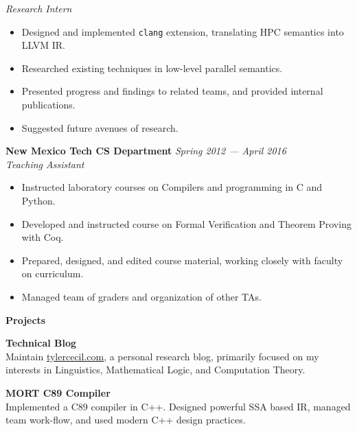 \documentclass[11pt,a4paper,sans]{article}
\newcommand{\cvcolor}[1]{{\color{MidnightBlue}#1}}
\renewcommand{\section}[1]{
  \cvcolor{\noindent \textbf{\LARGE #1}}
  \vspace{.5em}\\
}
\begin{document}
\textsl{Research Intern}
\begin{itemize}
  \item Designed and implemented \texttt{clang} extension, translating HPC semantics into LLVM IR.
  \item Researched existing techniques in low-level parallel semantics.
  \item Presented progress and findings to related teams, and provided internal publications.
  \item Suggested future avenues of research.
\end{itemize}
\vspace{0.2em}
\textbf{New Mexico Tech CS Department} \hfill \textsl{Spring 2012 --- April 2016}\\
\textsl{Teaching Assistant}
\begin{itemize}
  \item Instructed laboratory courses on Compilers and programming in C and
    Python.
  \item Developed and instructed course on Formal Verification and Theorem Proving with Coq.
  \item Prepared, designed, and edited course material, working closely with
    faculty on curriculum.
  \item Managed team of graders and organization of other TAs.
\end{itemize}
\vspace{1em}

\section{Projects}
\vspace{-2.5em}
\begin{multicols}{2}

  \noindent
  \textbf{Technical Blog}\\
  Maintain \href{https://tylercecil.com}{tylercecil.com}, a personal research
  blog, primarily focused on my interests in Linguistics, Mathematical Logic,
  and Computation Theory.

  \columnbreak

  \noindent
  \textbf{MORT C89 Compiler}\\
  Implemented a C89 compiler in C++. Designed powerful SSA based IR,
  managed team work-flow, and used modern C++ design practices.\\

\end{multicols}
\end{document}
